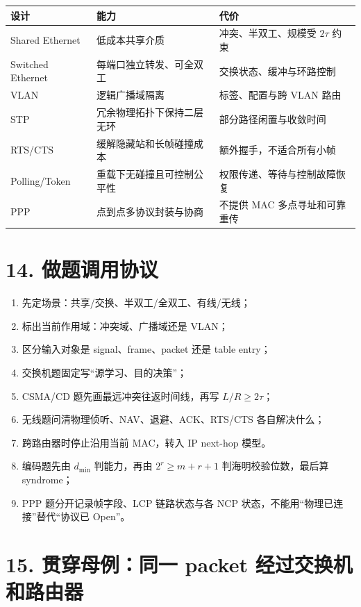 \documentclass[UTF8,fontset=none,11pt,a4paper]{ctexart}
\providecommand{\tightlist}{\setlength{\itemsep}{0pt}\setlength{\parskip}{0pt}}
\begin{document}
\begin{longtable}[]{@{}lll@{}}
\toprule\noalign{}
设计 & 能力 & 代价 \\
\midrule\noalign{}
\endhead
\bottomrule\noalign{}
\endlastfoot
Shared Ethernet & 低成本共享介质 & 冲突、半双工、规模受 \(2\tau\)
约束 \\
Switched Ethernet & 每端口独立转发、可全双工 &
交换状态、缓冲与环路控制 \\
VLAN & 逻辑广播域隔离 & 标签、配置与跨 VLAN 路由 \\
STP & 冗余物理拓扑下保持二层无环 & 部分路径闲置与收敛时间 \\
RTS/CTS & 缓解隐藏站和长帧碰撞成本 & 额外握手，不适合所有小帧 \\
Polling/Token & 重载下无碰撞且可控制公平性 & 权限传递、等待与控制故障恢复 \\
PPP & 点到点多协议封装与协商 & 不提供 MAC 多点寻址和可靠重传 \\
\end{longtable}

\section{14.
做题调用协议}\label{11-ux505aux9898ux8c03ux7528ux534fux8bae}

\begin{enumerate}
\def\labelenumi{\arabic{enumi}.}
\tightlist
\item
  先定场景：共享/交换、半双工/全双工、有线/无线；
\item
  标出当前作用域：冲突域、广播域还是 VLAN；
\item
  区分输入对象是 signal、frame、packet 还是 table entry；
\item
  交换机题固定写``源学习、目的决策''；
\item
  CSMA/CD 题先画最远冲突往返时间线，再写 \(L/R\ge2\tau\)；
\item
  无线题问清物理侦听、NAV、退避、ACK、RTS/CTS 各自解决什么；
\item
  跨路由器时停止沿用当前 MAC，转入 IP next-hop 模型。
\item
  编码题先由 $d_{\min}$ 判能力，再由 $2^r\ge m+r+1$ 判海明校验位数，最后算 syndrome；
\item
  PPP 题分开记录帧字段、LCP 链路状态与各 NCP 状态，不能用“物理已连接”替代“协议已 Open”。
\end{enumerate}

\section{15. 贯穿母例：同一 packet
经过交换机和路由器}\label{12-ux8d2fux7a7fux6bcdux4f8bux540cux4e00-packet-ux7ecfux8fc7ux4ea4ux6362ux673aux548cux8defux7531ux5668}
\end{document}
